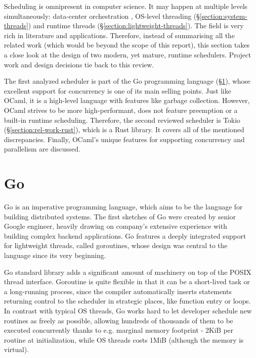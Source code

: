 \documentclass[12pt,a4paper,twoside]{report}
\begin{document}
Scheduling is omnipresent in computer science. It may happen at multiple levels simultaneously: data-center orchestration \cite{NomadbyH95:online}, OS-level threading (\S\ref{section:system-threads}) and runtime threads (\S\ref{section:lightweight-threads}). The field is very rich in literature and applications. Therefore, instead of summarising all the related work (which would be beyond the scope of this report), this section takes a close look at the design of two modern, yet mature, runtime schedulers. Project work and design decisions tie back to this review. 

The first analyzed scheduler is part of the Go programming language (\S\ref{section:rel-work-go}), whose excellent support for concurrency is one of its main selling points. Just like OCaml, it is a high-level language with features like garbage collection. However, OCaml strives to be more high-performant, does not feature preemption or a built-in runtime scheduling. Therefore, the second reviewed scheduler is Tokio (\S\ref{section:rel-work-rust}), which is a Rust library. It covers all of the mentioned discrepancies. Finally, OCaml's unique features for supporting concurrency and parallelism are discussed. 

\section{Go}
\label{section:rel-work-go}
Go is an imperative programming language, which aims to be the language for building distributed systems. The first sketches of Go were created by senior Google engineer, heavily drawing on company's extensive experience with building complex backend applications. Go features a deeply integrated support for lightweight threads, called goroutines, whose design was central to the language since its very beginning.

Go standard library adds a significant amount of machinery on top of the POSIX thread interface. Goroutine is quite flexible in that it can be a short-lived task or a long-running process, since the compiler automatically inserts statements returning control to the scheduler in strategic places, like function entry or loops. In contrast with typical OS threads, Go works hard to let developer schedule new routines as freely as possible, allowing hundreds of thousands of them to be executed concurrently thanks to e.g. marginal memory footprint - 2KiB per routine at initialization, while OS threads costs 1MiB (although the memory is virtual). 
\end{document}

